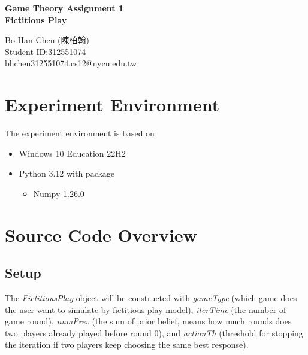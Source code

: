 \documentclass[a4paper, oneside, final, 12pt]{scrartcl} %
\begin{document}


\begin{center}
    {\fontsize{18}{30}\textbf{Game Theory Assignment 1 \\ Fictitious Play}}
\end{center}

\begin{center}
  Bo-Han Chen (陳柏翰) \\
  Student ID:312551074 \\
  bhchen312551074.cs12@nycu.edu.tw
\end{center}

\section{Experiment Environment}

The experiment environment is based on
\begin{itemize}
  \item Windows 10 Education 22H2
  \item Python 3.12 with package
  \begin{itemize}
    \item Numpy 1.26.0
  \end{itemize}
\end{itemize}

\section{Source Code Overview}

\subsection{Setup}

\begingroup
\raggedright
The \emph{FictitiousPlay} object will be constructed with \emph{gameType} 
(which game does the user want to simulate by fictitious play model),
\emph{iterTime} (the number of game round), \emph{numPrev} 
(the sum of prior belief, means how much rounds does two players already played before round 0),
and \emph{actionTh} (threshold for stopping the iteration if two players keep choosing the same best response).
\end{document}
